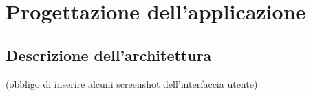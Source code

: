 \section{Progettazione dell'applicazione}
\subsection{Descrizione dell'architettura}
(obbligo di inserire alcuni screenshot dell'interfaccia utente)

